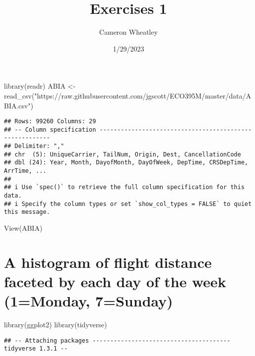 \documentclass[
]{article}
\title{Exercises 1}
\author{Cameron Wheatley}
\date{1/29/2023}
\newenvironment{Shaded}{\begin{snugshade}}{\end{snugshade}}
\newcommand{\FunctionTok}[1]{\textcolor[rgb]{0.00,0.00,0.00}{#1}}
\newcommand{\NormalTok}[1]{#1}
\newcommand{\OtherTok}[1]{\textcolor[rgb]{0.56,0.35,0.01}{#1}}
\newcommand{\StringTok}[1]{\textcolor[rgb]{0.31,0.60,0.02}{#1}}
\begin{document}
\maketitle

\begin{Shaded}
\begin{Highlighting}[]
\FunctionTok{library}\NormalTok{(readr)}
\NormalTok{ABIA }\OtherTok{\textless{}{-}} \FunctionTok{read\_csv}\NormalTok{(}\StringTok{"https://raw.githubusercontent.com/jgscott/ECO395M/master/data/ABIA.csv"}\NormalTok{)}
\end{Highlighting}
\end{Shaded}

\begin{verbatim}
## Rows: 99260 Columns: 29
## -- Column specification --------------------------------------------------------
## Delimiter: ","
## chr  (5): UniqueCarrier, TailNum, Origin, Dest, CancellationCode
## dbl (24): Year, Month, DayofMonth, DayOfWeek, DepTime, CRSDepTime, ArrTime, ...
## 
## i Use `spec()` to retrieve the full column specification for this data.
## i Specify the column types or set `show_col_types = FALSE` to quiet this message.
\end{verbatim}

\begin{Shaded}
\begin{Highlighting}[]
\FunctionTok{View}\NormalTok{(ABIA)}
\end{Highlighting}
\end{Shaded}

\hypertarget{a-histogram-of-flight-distance-faceted-by-each-day-of-the-week-1monday-7sunday}{%
\section{A histogram of flight distance faceted by each day of the week
(1=Monday,
7=Sunday)}\label{a-histogram-of-flight-distance-faceted-by-each-day-of-the-week-1monday-7sunday}}

\begin{Shaded}
\begin{Highlighting}[]
\FunctionTok{library}\NormalTok{(ggplot2)}
\FunctionTok{library}\NormalTok{(tidyverse)}
\end{Highlighting}
\end{Shaded}

\begin{verbatim}
## -- Attaching packages --------------------------------------- tidyverse 1.3.1 --
\end{verbatim}
\end{document}
